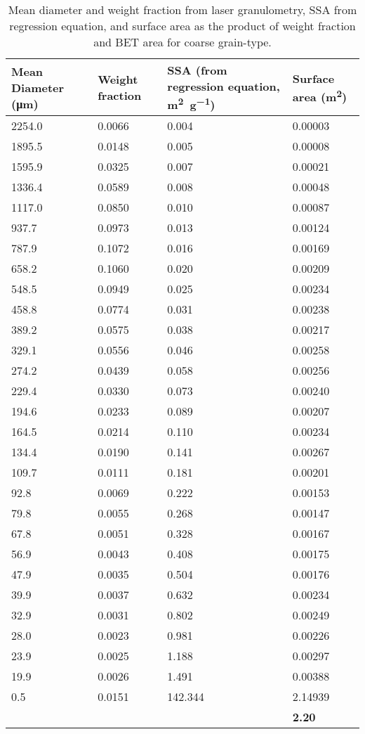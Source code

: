  \begin{table}[h!]
   \centering
     \begin{tabularx}{\linewidth}{|X|X|X|X|}
     \toprule
     \textbf{Mean Diameter (\si{\micro\meter})} & \textbf{Weight fraction} & \textbf{SSA  (from regression equation, \si{\square\meter\per\gram})} & \textbf{Surface area (\si{\square\metre})} \\
     \midrule
     2254.0 & 0.0066 & 0.004 & 0.00003 \\
     1895.5 & 0.0148 & 0.005 & 0.00008 \\
     1595.9 & 0.0325 & 0.007 & 0.00021 \\
     1336.4 & 0.0589 & 0.008 & 0.00048 \\
     1117.0 & 0.0850 & 0.010 & 0.00087 \\
     937.7 & 0.0973 & 0.013 & 0.00124 \\
     787.9 & 0.1072 & 0.016 & 0.00169 \\
     658.2 & 0.1060 & 0.020 & 0.00209 \\
     548.5 & 0.0949 & 0.025 & 0.00234 \\
     458.8 & 0.0774 & 0.031 & 0.00238 \\
     389.2 & 0.0575 & 0.038 & 0.00217 \\
     329.1 & 0.0556 & 0.046 & 0.00258 \\
     274.2 & 0.0439 & 0.058 & 0.00256 \\
     229.4 & 0.0330 & 0.073 & 0.00240 \\
     194.6 & 0.0233 & 0.089 & 0.00207 \\
     164.5 & 0.0214 & 0.110 & 0.00234 \\
     134.4 & 0.0190 & 0.141 & 0.00267 \\
     109.7 & 0.0111 & 0.181 & 0.00201 \\
     92.8 & 0.0069 & 0.222 & 0.00153 \\
     79.8 & 0.0055 & 0.268 & 0.00147 \\
     67.8 & 0.0051 & 0.328 & 0.00167 \\
     56.9 & 0.0043 & 0.408 & 0.00175 \\
     47.9 & 0.0035 & 0.504 & 0.00176 \\
     39.9 & 0.0037 & 0.632 & 0.00234 \\
     32.9 & 0.0031 & 0.802 & 0.00249 \\
     28.0 & 0.0023 & 0.981 & 0.00226 \\
     23.9 & 0.0025 & 1.188 & 0.00297 \\
     19.9 & 0.0026 & 1.491 & 0.00388 \\
     0.5 & 0.0151 & 142.344 & 2.14939 \\
       &   &   & \textbf{2.20} \\
       \bottomrule
     \end{tabularx}
   \caption{Mean diameter and weight fraction from laser granulometry, SSA from regression equation, and surface area as the product of weight fraction and BET area for coarse grain-type.}
   \vfill
   \label{tab:app_bet_laser_coarse}
 \end{table}

